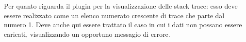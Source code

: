 \documentclass[a4paper, oneside, openany]{article}
\begin{document}
	Per quanto riguarda il plugin per la visualizzazione delle stack trace: esso deve essere realizzato come un elenco numerato crescente di trace che parte dal numero 1. Deve anche qui essere trattato il caso in cui i dati non possano essere caricati, visualizzando un opportuno messagio di errore.
	
	
\end{document}
